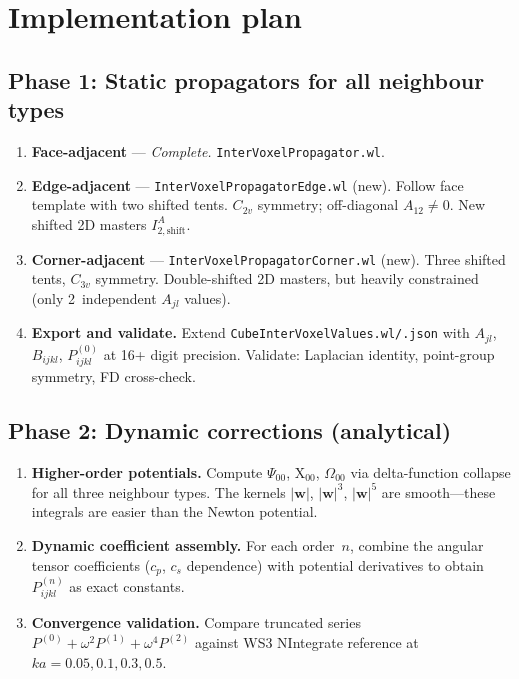 \documentclass[11pt,a4paper]{article}
\newcommand{\bw}{\bm{w}}
\theoremstyle{plain}
\theoremstyle{remark}
\begin{document}
\section{Implementation plan}
\label{sec:plan}

\subsection{Phase 1: Static propagators for all neighbour types}

\begin{enumerate}[label=\textbf{1\alph*.},nosep]
  \item \textbf{Face-adjacent} --- \emph{Complete.}
    \texttt{InterVoxelPropagator.wl}.

  \item \textbf{Edge-adjacent} ---
    \texttt{InterVoxelPropagatorEdge.wl} (new).
    Follow face template with two shifted tents.
    $C_{2v}$ symmetry; off-diagonal $A_{12}\neq 0$.
    New shifted 2D masters $I^A_{2,\mathrm{shift}}$.

  \item \textbf{Corner-adjacent} ---
    \texttt{InterVoxelPropagatorCorner.wl} (new).
    Three shifted tents, $C_{3v}$ symmetry.
    Double-shifted 2D masters, but heavily constrained
    (only 2~independent $A_{jl}$ values).

  \item \textbf{Export and validate.}
    Extend \texttt{CubeInterVoxelValues.wl/.json} with
    $A_{jl}$, $B_{ijkl}$, $P^{(0)}_{ijkl}$ at 16+ digit precision.
    Validate: Laplacian identity, point-group symmetry, FD cross-check.
\end{enumerate}

\subsection{Phase 2: Dynamic corrections (analytical)}

\begin{enumerate}[label=\textbf{2\alph*.},nosep]
  \item \textbf{Higher-order potentials.}
    Compute $\Psi_{00}$, $\mathrm{X}_{00}$, $\Omega_{00}$ via
    delta-function collapse for all three neighbour types.
    The kernels $|\bw|$, $|\bw|^3$, $|\bw|^5$ are smooth---these
    integrals are easier than the Newton potential.

  \item \textbf{Dynamic coefficient assembly.}
    For each order~$n$, combine the angular tensor coefficients
    ($c_p$, $c_s$ dependence) with potential derivatives to obtain
    $P^{(n)}_{ijkl}$ as exact constants.

  \item \textbf{Convergence validation.}
    Compare truncated series
    $P^{(0)} + \omega^2 P^{(1)} + \omega^4 P^{(2)}$ against WS3
    NIntegrate reference at $ka = 0.05, 0.1, 0.3, 0.5$.
\end{enumerate}
\end{document}
